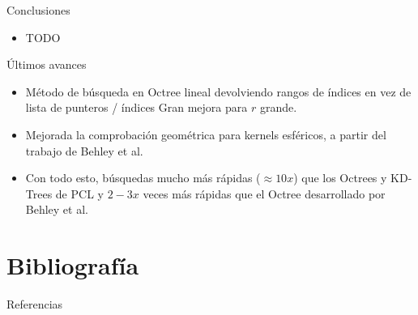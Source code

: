 \documentclass[aspectratio=169]{beamer}
\begin{document}
\begin{frame}{Conclusiones}
    \begin{itemize}
        \item TODO
    \end{itemize}
\end{frame}

\begin{frame}{Últimos avances}
    \begin{itemize}
        \item Método de búsqueda en Octree lineal devolviendo rangos de índices en vez de lista de punteros / índices \textrightarrow \: Gran mejora para $r$ grande.
        \item Mejorada la comprobación geométrica para kernels esféricos, a partir del trabajo de Behley et al. \cite{behley2015efficient}
        \item Con todo esto, búsquedas mucho más rápidas ($\approx 10x$) que los Octrees y KD-Trees de PCL y $2-3x$ veces más rápidas que el Octree desarrollado por Behley et al. \cite{behley2015efficient}
    \end{itemize}
\end{frame}

\section{Bibliografía}
\begin{frame}[allowframebreaks]{Referencias}
    \printbibliography
\end{frame}




\end{document}
